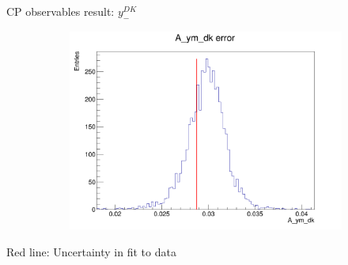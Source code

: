 \documentclass{beamer}
\begin{document}
\begin{frame}{CP observables result: $y_-^{DK}$}
\begin{figure}
\begin{subfigure}{0.42\textwidth}
      \includegraphics[width = 1.0\textwidth]{Plots/A_ym_dk_error_WithDataUncertainty.png}
    \end{subfigure}
  \end{figure}
  \begin{center}
    Red line: Uncertainty in fit to data
  \end{center}
\end{frame}
\end{document}

